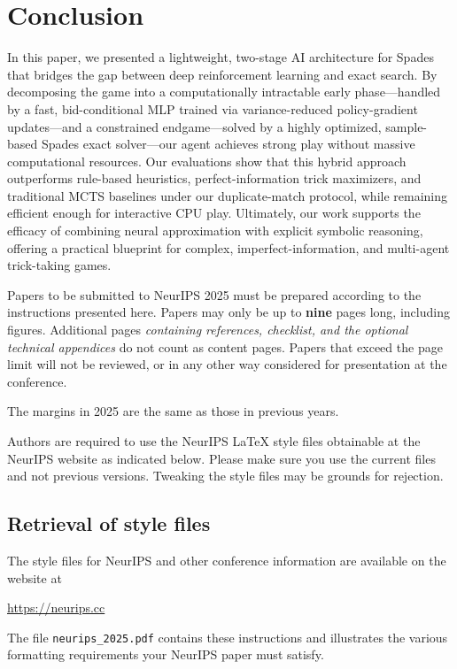 \documentclass{article}
\begin{document}
\section{Conclusion}

In this paper, we presented a lightweight, two-stage AI architecture for Spades that bridges the gap between deep reinforcement learning and exact search. By decomposing the game into a computationally intractable early phase---handled by a fast, bid-conditional MLP trained via variance-reduced policy-gradient updates---and a constrained endgame---solved by a highly optimized, sample-based Spades exact solver---our agent achieves strong play without massive computational resources. Our evaluations show that this hybrid approach outperforms rule-based heuristics, perfect-information trick maximizers, and traditional MCTS baselines under our duplicate-match protocol, while remaining efficient enough for interactive CPU play. Ultimately, our work supports the efficacy of combining neural approximation with explicit symbolic reasoning, offering a practical blueprint for complex, imperfect-information, and multi-agent trick-taking games.

\iffalse %
Papers to be submitted to NeurIPS 2025 must be prepared according to the
instructions presented here. Papers may only be up to {\bf nine} pages long,
including figures.
Additional pages \emph{containing references, checklist, and the optional technical appendices} do not count as content pages.
Papers that exceed the page limit will not be
reviewed, or in any other way considered for presentation at the conference.


The margins in 2025 are the same as those in previous years.


Authors are required to use the NeurIPS \LaTeX{} style files obtainable at the
NeurIPS website as indicated below. Please make sure you use the current files
and not previous versions. Tweaking the style files may be grounds for
rejection.


\subsection{Retrieval of style files}


The style files for NeurIPS and other conference information are available on
the website at
\begin{center}
  \url{https://neurips.cc}
\end{center}
The file \verb+neurips_2025.pdf+ contains these instructions and illustrates the
various formatting requirements your NeurIPS paper must satisfy.
\end{document}
